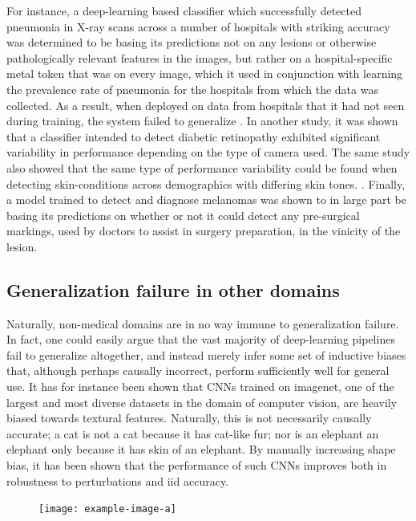 	For instance, a deep-learning based classifier which successfully detected pneumonia in X-ray scans across a number of hospitals with striking accuracy was determined to be basing its predictions not on any lesions or otherwise pathologically relevant features in the images, but rather on a hospital-specific metal token that was on every image, which it used in conjunction with learning the prevalence rate of pneumonia for the hospitals from which the data was collected. As a result, when deployed on data from hospitals that it had not seen during training, the system failed to generalize \cite{pneumonia}. In another study, it was shown that a classifier intended to detect diabetic retinopathy exhibited significant variability in performance depending on the type of camera used. The same study also showed that the same type of performance variability could be found when detecting skin-conditions across demographics with differing skin tones. \cite{damour2020underspecification}. Finally, a model trained to detect and diagnose melanomas  was shown to in large part be basing its predictions on whether or not it could detect any pre-surgical markings, used by doctors to assist in surgery preparation, in the vinicity of the lesion\cite{skin_shortcut}.  
	 
	\subsection{Generalization failure in other domains}
	Naturally, non-medical domains are in no way immune to generalization failure. In fact, one could easily argue that the vast majority of deep-learning pipelines fail to generalize altogether, and instead merely infer some set of inductive biases that, although perhaps causally incorrect, perform sufficiently well for general use. It has for instance been shown that CNNs trained on imagenet, one of the largest and most diverse datasets in the domain of computer vision, are heavily biased towards textural features\cite{texturebias}. Naturally, this is not necessarily causally accurate; a cat is not a cat because it has cat-like fur; nor is an elephant an elephant only because it has skin of an elephant. By manually increasing shape bias, it has been shown that the performance of such CNNs improves both in robustness to perturbations and iid accuracy.

	\begin{figure}[h]
		\texttt{[image: example-image-a]}
		\caption{}
		\label{cat_elephant}
	\end{figure}
	
